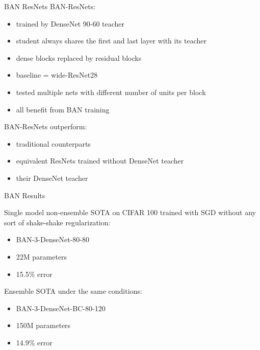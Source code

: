 \documentclass{beamer}
\begin{document}
\begin{frame}{BAN ResNets}
BAN-ResNets:
\begin{itemize}
\item trained by DenseNet 90-60 teacher
\item student always shares the first and last layer with its
teacher
\item dense blocks replaced by residual blocks
\item baseline = wide-ResNet28 \cite{cit:resnet}
\item tested multiple nets with different number of units per block
\item all benefit from BAN training

\end{itemize}

\vfill

BAN-ResNets outperform:
\begin{itemize}
\item traditional counterparts
\item equivalent ResNets trained without DenseNet teacher
\item their DenseNet teacher
\end{itemize}
\end{frame}
\begin{frame}{BAN Results}

Single model non-ensemble SOTA on CIFAR 100 trained with SGD without any sort
of shake-shake regularization:
\begin{itemize}
\item BAN-3-DenseNet-80-80
\item 22M parameters
\item 15.5\% error 
\end{itemize}

\vfill

Ensemble SOTA under the same conditions:
\begin{itemize}
\item BAN-3-DenseNet-BC-80-120
\item 150M parameters
\item 14.9\% error 
\end{itemize}
\end{frame}
\end{document}
